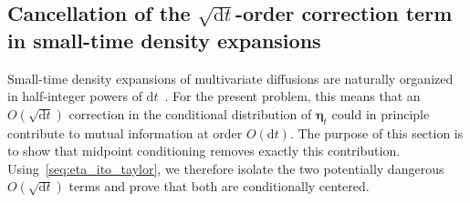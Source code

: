 \documentclass[
 longbibliography,
 twocolumn,
 superscriptaddress,
 amsmath,
 amssymb,
 amsthm,
 amsfonts,
 prl,
 floatfix,
]{revtex4-2}
\newcommand{\matbf}[1]{\boldsymbol{\mathsf{#1}}}
\begin{document}
\begin{widetext}


\subsection{Cancellation of the $\sqrt{\mathrm{d}t}$-order correction term in small-time density expansions}
\vspace*{-0.6\baselineskip}
Small-time density expansions of multivariate diffusions are naturally organized in half-integer powers of $\mathrm dt$~\cite{watanabe1987analysis,yoshida1992asymptotic,li2013maximum,yang2019anew}. For the present problem, this means that an $O(\sqrt{\mathrm dt})$ correction in the conditional distribution of $\bm\eta_t$ could in principle contribute to mutual information at order $O(\mathrm dt)$. The purpose of this section is to show that midpoint conditioning removes exactly this contribution. Using~\eqref{seq:eta_ito_taylor}, we therefore isolate the two potentially dangerous $O(\sqrt{\mathrm dt})$ terms and prove that both are conditionally centered.


\end{widetext}
\end{document}
